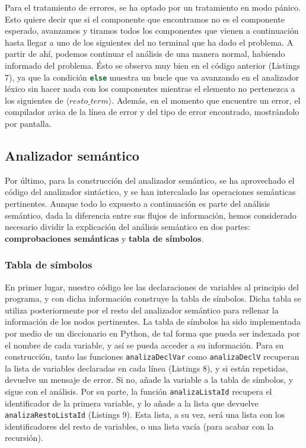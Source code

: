 \documentclass[11pt]{article}
\newcommand{\nt}[1]{\langle#1\rangle}
\begin{document}
Para el tratamiento de errores, se ha optado por un tratamiento en modo pánico. Esto quiere decir que si el componente que encontramos no es el componente esperado, avanzamos y tiramos todos los componentes que vienen a continuación hasta llegar a uno de los siguientes del no terminal que ha dado el problema. A partir de ahí, podemos continuar el análisis de una manera normal, habiendo informado del problema. Ésto se observa muy bien en el código anterior (Listings 7), ya que la condición \lstinline[language=Python]{else} muestra un bucle que va avanzando en el analizador léxico sin hacer nada con los componentes mientras el elemento no pertenezca a los siguientes de $\nt{resto\_term}$. Además, en el momento que encuentre un error, el compilador avisa de la línea de error y del tipo de error encontrado, mostrándolo por pantalla.

\subsection{Analizador semántico}
Por último, para la construcción del analizador semántico, se ha aprovechado el código del analizador sintáctico, y se han intercalado las operaciones semánticas pertinentes. Aunque todo lo expuesto a continuación es parte del análisis semántico, dada la diferencia entre sus flujos de información, hemos considerado necesario dividir la explicación del análisis semántico en dos partes: \textbf{comprobaciones semánticas} y \textbf{tabla de símbolos}.

\subsubsection{Tabla de símbolos}
En primer lugar, nuestro código lee las declaraciones de variables al principio del programa, y con dicha información construye la tabla de símbolos. Dicha tabla se utiliza posteriormente por el resto del analizador semántico para rellenar la información de los nodos pertinentes.
La tabla de símbolos ha sido implementada por medio de un diccionario en Python, de tal forma que pueda ser indexada por el nombre de cada variable, y así se pueda acceder a su información. Para su construcción, tanto las funciones \lstinline[language=Python]{analizaDeclVar} como \lstinline[language=Python]{analizaDeclV} recuperan la lista de variables declaradas en cada línea (Listings 8), y si están repetidas, devuelve un mensaje de error. Si no, añade la variable a la tabla de símbolos, y sigue con el análisis. Por su parte, la función \lstinline[language=Python]{analizaListaId} recupera el identificador de la primera variable, y lo añade a la lista que devuelve \lstinline[language=Python]{analizaRestoListaId} (Listings 9). Esta lista, a su vez, será una lista con los identificadores del resto de variables, o una lista vacía (para acabar con la recursión).
\end{document}
